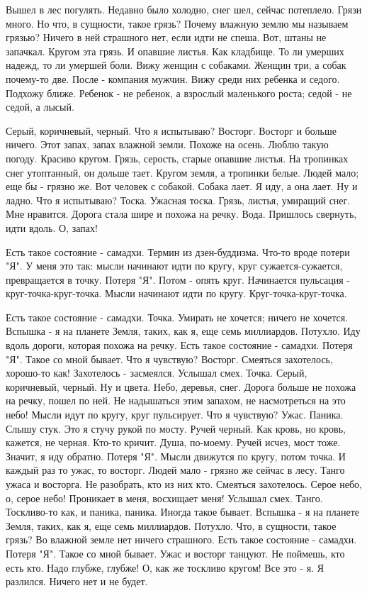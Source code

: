 \documentclass{article}
\begin{document}
\title{}
\author{}
\date{}
\maketitle


\renewcommand{\d}{\Diamond}
\newcommand{\s}{\square}

Вышел в лес погулять. Недавно было холодно, снег шел, сейчас потеплело. Грязи много. Но что, в сущности, такое грязь? Почему влажную землю мы называем грязью? Ничего в ней страшного нет, если идти не спеша. Вот, штаны не запачкал. Кругом эта грязь. И опавшие листья. Как кладбище. То ли умерших надежд, то ли умершей боли. Вижу женщин с собаками. Женщин три, а собак почему-то две. После - компания мужчин. Вижу среди них ребенка и седого. Подхожу ближе. Ребенок - не ребенок, а взрослый маленького роста; седой - не седой, а лысый. 

Серый, коричневый, черный. Что я испытываю? Восторг. Восторг и больше ничего. Этот запах, запах влажной земли. Похоже на осень. Люблю такую погоду. Красиво кругом. Грязь, серость, старые опавшие листья. На тропинках снег утоптанный, он дольше тает. Кругом земля, а тропинки белые. Людей мало; еще бы - грязно же. Вот человек с собакой. Собака лает. Я иду, а она лает. Ну и ладно. Что я испытываю? Тоска. Ужасная тоска. Грязь, листья, умиращий снег. Мне нравится. Дорога стала шире и похожа на речку. Вода. Пришлось свернуть, идти вдоль. О, запах!

Есть такое состояние - самадхи. Термин из дзен-буддизма. Что-то вроде потери "Я". У меня это так: мысли начинают идти по кругу, круг сужается-сужается, превращается в точку. Потеря "Я". Потом - опять круг. Начинается пульсация - круг-точка-круг-точка. Мысли начинают идти по кругу. Круг-точка-круг-точка. 

Есть такое состояние - самадхи. Точка. Умирать не хочется; ничего не хочется. Вспышка - я на планете Земля, таких, как я, еще семь миллиардов. Потухло. Иду вдоль дороги, которая похожа на речку. Есть такое состояние - самадхи. Потеря "Я". Такое со мной бывает. Что я чувствую? Восторг. Смеяться захотелось, хорошо-то как! Захотелось - засмеялся. Услышал смех. Точка. Серый, коричневый, черный. Ну и цвета. Небо, деревья, снег. Дорога больше не похожа на речку, пошел по ней. Не надышаться этим запахом, не насмотреться на это небо! Мысли идут по кругу, круг пульсирует. Что я чувствую? Ужас. Паника. Слышу стук. Это я стучу рукой по мосту. Ручей черный. Как кровь, но кровь, кажется, не черная. Кто-то кричит. Душа, по-моему. Ручей исчез, мост тоже. Значит, я иду обратно. Потеря "Я". Мысли движутся по кругу, потом точка. И каждый раз то ужас, то восторг. Людей мало - грязно же сейчас в лесу. Танго ужаса и восторга. Не разобрать, кто из них кто. Смеяться захотелось. Серое небо, о, серое небо! Проникает в меня, восхищает меня! Услышал смех. Танго. Тоскливо-то как, и паника, паника. Иногда такое бывает. Вспышка - я на планете Земля, таких, как я, еще семь миллиардов. Потухло. Что, в сущности, такое грязь? Во влажной земле нет ничего страшного. Есть такое состояние - самадхи. Потеря "Я". Такое со мной бывает.
Ужас и восторг танцуют. Не поймешь, кто есть кто. Надо глубже, глубже! О, как же тоскливо кругом! Все это - я. Я разлился. Ничего нет и не будет.
\end{document}
